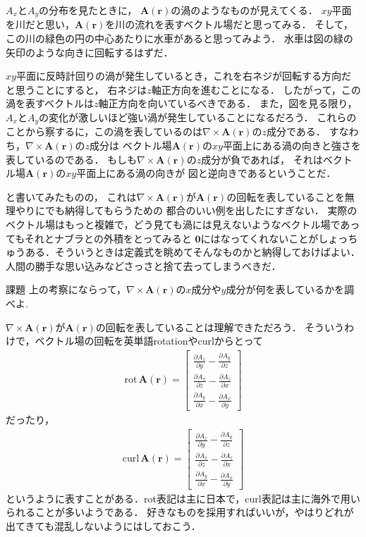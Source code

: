 $A_x$と$A_y$の分布を見たときに，
$\bm{A}(\bm{r})$の渦のようなものが見えてくる．
$xy$平面を川だと思い，$\bm{A}(\bm{r})$を川の流れを表すベクトル場だと思ってみる．
そして，この川の緑色の円の中心あたりに水車があると思ってみよう．
水車は図の緑の矢印のような向きに回転するはずだ．


$xy$平面に反時計回りの渦が発生しているとき，これを右ネジが回転する方向だと思うことにすると，
右ネジは$z$軸正方向を進むことになる．
したがって，この渦を表すベクトルは$z$軸正方向を向いているべきである．
また，図を見る限り，$A_x$と$A_y$の変化が激しいほど強い渦が発生していることになるだろう．
これらのことから察するに，この渦を表しているのは$\nabla \times \bm{A}(\bm{r})$の$z$成分である．
すなわち，$\nabla \times \bm{A}(\bm{r})$の$z$成分は
ベクトル場$\bm{A}(\bm{r})$の$xy$平面上にある渦の向きと強さを表しているのである．
もしも$\nabla \times \bm{A}(\bm{r})$の$z$成分が負であれば，
それはベクトル場$\bm{A}(\bm{r})$の$xy$平面上にある渦の向きが
図と逆向きであるということだ．

と書いてみたものの，
これは$\nabla \times \bm{A}(\bm{r})$が$\bm{A}(\bm{r})$の回転を表していることを無理やりにでも納得してもらうための
都合のいい例を出したにすぎない．
実際のベクトル場はもっと複雑で，どう見ても渦には見えないようなベクトル場であってもそれとナブラとの外積をとってみると
$\bm{0}$にはなってくれないことがしょっちゅうある．そういうときは定義式を眺めてそんなものかと納得しておけばよい．
人間の勝手な思い込みなどさっさと捨て去ってしまうべきだ．
\begin{itembox}[l]{課題}
上の考察にならって，$\nabla \times \bm{A}(\bm{r})$の$x$成分や$y$成分が何を表しているかを調べよ.
\end{itembox}

$\nabla \times \bm{A}(\bm{r})$が$\bm{A}(\bm{r})$の回転を表していることは理解できただろう．
そういうわけで，ベクトル場の回転を英単語rotationやcurlからとって
\begin{eqnarray}
\mathrm{rot} \, \bm{A}(\bm{r}) = \left[
\begin{array}{c}
\displaystyle
\frac{\partial A_z}{\partial y} - \frac{\partial A_y}{\partial z} \\
\displaystyle
\frac{\partial A_x}{\partial z} - \frac{\partial A_z}{\partial x} \\
\displaystyle
\frac{\partial A_y}{\partial x} - \frac{\partial A_x}{\partial y} 
\end{array}
\right]
\label{eq:rotrot}
\end{eqnarray}
だったり，
\begin{eqnarray}
\mathrm{curl} \, \bm{A}(\bm{r}) = \left[
\begin{array}{c}
\displaystyle
\frac{\partial A_z}{\partial y} - \frac{\partial A_y}{\partial z} \\
\displaystyle
\frac{\partial A_x}{\partial z} - \frac{\partial A_z}{\partial x} \\
\displaystyle
\frac{\partial A_y}{\partial x} - \frac{\partial A_x}{\partial y} 
\end{array}
\right]
\label{eq:rotcurl}
\end{eqnarray}
というように表すことがある．rot表記は主に日本で，curl表記は主に海外で用いられることが多いようである．
好きなものを採用すればいいが，やはりどれが出てきても混乱しないようにはしておこう．

